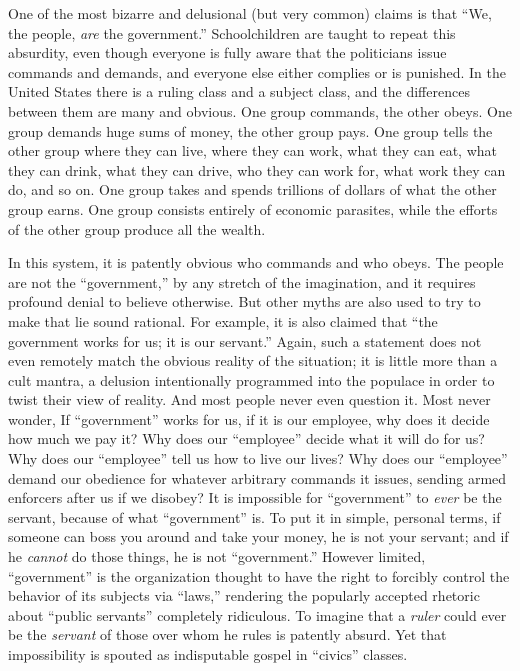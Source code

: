 \documentclass{book}
\begin{document}
One of the most bizarre and delusional (but very common) claims is that \enquote{We, the people, \emph{are} the government.} Schoolchildren are taught to repeat this absurdity, even though everyone is fully aware that the politicians issue commands and demands, and everyone else either complies or is punished. In the United States there is a ruling class and a subject class, and the differences between them are many and obvious. One group commands, the other obeys. One group demands huge sums of money, the other group pays. One group tells the other group where they can live, where they can work, what they can eat, what they can drink, what they can drive, who they can work for, what work they can do, and so on. One group takes and spends trillions of dollars of what the other group earns. One group consists entirely of economic parasites, while the efforts of the other group produce all the wealth.

In this system, it is patently obvious who commands and who obeys. The people are not the \enquote{government,} by any stretch of the imagination, and it requires profound denial to believe otherwise. But other myths are also used to try to make that lie sound rational. For example, it is also claimed that \enquote{the government works for us; it is our servant.} Again, such a statement does not even remotely match the obvious reality of the situation; it is little more than a cult mantra, a delusion intentionally programmed into the populace in order to twist their view of reality. And most people never even question it. Most never wonder, If \enquote{government} works for us, if it is our employee, why does it decide how much we pay it? Why does our \enquote{employee} decide what it will do for us? Why does our \enquote{employee} tell us how to live our lives? Why does our \enquote{employee} demand our obedience for whatever arbitrary commands it issues, sending armed enforcers after us if we disobey? It is impossible for \enquote{government} to \emph{ever} be the servant, because of what \enquote{government} is. To put it in simple, personal terms, if someone can boss you around and take your money, he is not your servant; and if he \emph{cannot} do those things, he is not \enquote{government.} However limited, \enquote{government} is the organization thought to have the right to forcibly control the behavior of its subjects via \enquote{laws,} rendering the popularly accepted rhetoric about \enquote{public servants} completely ridiculous. To imagine that a \emph{ruler} could ever be the \emph{servant} of those over whom he rules is patently absurd. Yet that impossibility is spouted as indisputable gospel in \enquote{civics} classes.
\end{document}

